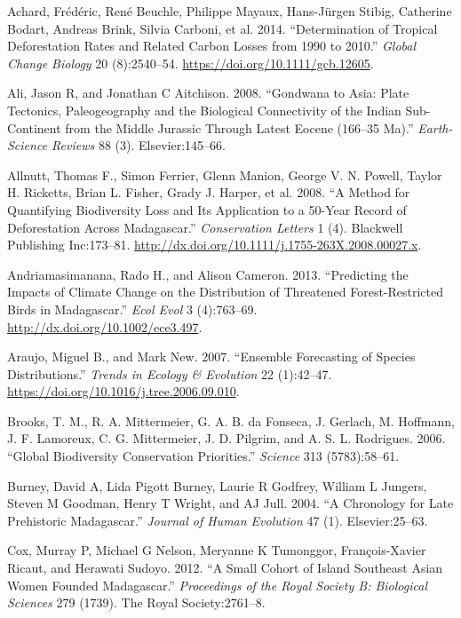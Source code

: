 \documentclass[12pt,]{article}
\begin{document}
\leavevmode\hypertarget{ref-Achard2014}{}%
Achard, Frédéric, René Beuchle, Philippe Mayaux, Hans-Jürgen Stibig,
Catherine Bodart, Andreas Brink, Silvia Carboni, et al. 2014.
``Determination of Tropical Deforestation Rates and Related Carbon
Losses from 1990 to 2010.'' \emph{Global Change Biology} 20
(8):2540--54. \url{https://doi.org/10.1111/gcb.12605}.

\leavevmode\hypertarget{ref-Ali2008}{}%
Ali, Jason R, and Jonathan C Aitchison. 2008. ``Gondwana to Asia: Plate
Tectonics, Paleogeography and the Biological Connectivity of the Indian
Sub-Continent from the Middle Jurassic Through Latest Eocene (166--35
Ma).'' \emph{Earth-Science Reviews} 88 (3). Elsevier:145--66.

\leavevmode\hypertarget{ref-Allnutt2008}{}%
Allnutt, Thomas F., Simon Ferrier, Glenn Manion, George V. N. Powell,
Taylor H. Ricketts, Brian L. Fisher, Grady J. Harper, et al. 2008. ``A
Method for Quantifying Biodiversity Loss and Its Application to a
50-Year Record of Deforestation Across Madagascar.'' \emph{Conservation
Letters} 1 (4). Blackwell Publishing Inc:173--81.
\url{http://dx.doi.org/10.1111/j.1755-263X.2008.00027.x}.

\leavevmode\hypertarget{ref-Andriamasimanana2013}{}%
Andriamasimanana, Rado H., and Alison Cameron. 2013. ``Predicting the
Impacts of Climate Change on the Distribution of Threatened
Forest-Restricted Birds in Madagascar.'' \emph{Ecol Evol} 3 (4):763--69.
\url{http://dx.doi.org/10.1002/ece3.497}.

\leavevmode\hypertarget{ref-Araujo2007a}{}%
Araujo, Miguel B., and Mark New. 2007. ``Ensemble Forecasting of Species
Distributions.'' \emph{Trends in Ecology \& Evolution} 22 (1):42--47.
\url{https://doi.org/10.1016/j.tree.2006.09.010}.

\leavevmode\hypertarget{ref-Brooks2006}{}%
Brooks, T. M., R. A. Mittermeier, G. A. B. da Fonseca, J. Gerlach, M.
Hoffmann, J. F. Lamoreux, C. G. Mittermeier, J. D. Pilgrim, and A. S. L.
Rodrigues. 2006. ``Global Biodiversity Conservation Priorities.''
\emph{Science} 313 (5783):58--61.

\leavevmode\hypertarget{ref-Burney2004}{}%
Burney, David A, Lida Pigott Burney, Laurie R Godfrey, William L
Jungers, Steven M Goodman, Henry T Wright, and AJ Jull. 2004. ``A
Chronology for Late Prehistoric Madagascar.'' \emph{Journal of Human
Evolution} 47 (1). Elsevier:25--63.

\leavevmode\hypertarget{ref-Cox2012}{}%
Cox, Murray P, Michael G Nelson, Meryanne K Tumonggor, François-Xavier
Ricaut, and Herawati Sudoyo. 2012. ``A Small Cohort of Island Southeast
Asian Women Founded Madagascar.'' \emph{Proceedings of the Royal Society
B: Biological Sciences} 279 (1739). The Royal Society:2761--8.
\end{document}
